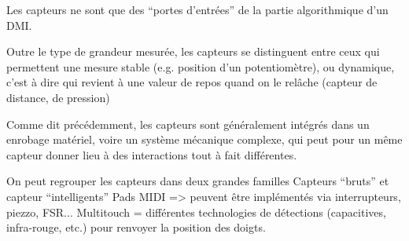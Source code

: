 Les capteurs ne sont que des ``portes d'entrées'' de la partie algorithmique d'un \gls{DMI}. 

Outre le type de grandeur mesurée, les capteurs se distinguent entre ceux qui permettent une mesure stable (e.g. position d'un potentiomètre), ou dynamique, c'est à dire qui revient à une valeur de repos quand on le relâche (capteur de distance, de pression)

Comme dit précédemment, les capteurs sont généralement intégrés dans un enrobage matériel, voire un système mécanique complexe, qui peut pour un même capteur donner lieu à des interactions tout à fait différentes. 

On peut regrouper les capteurs dans deux grandes familles
Capteurs ``bruts'' et capteur ``intelligents''
Pads MIDI => peuvent être implémentés via interrupteurs, piezzo, FSR...
Multitouch = différentes technologies de détections (capacitives, infra-rouge, etc.) pour renvoyer la position des doigts.

